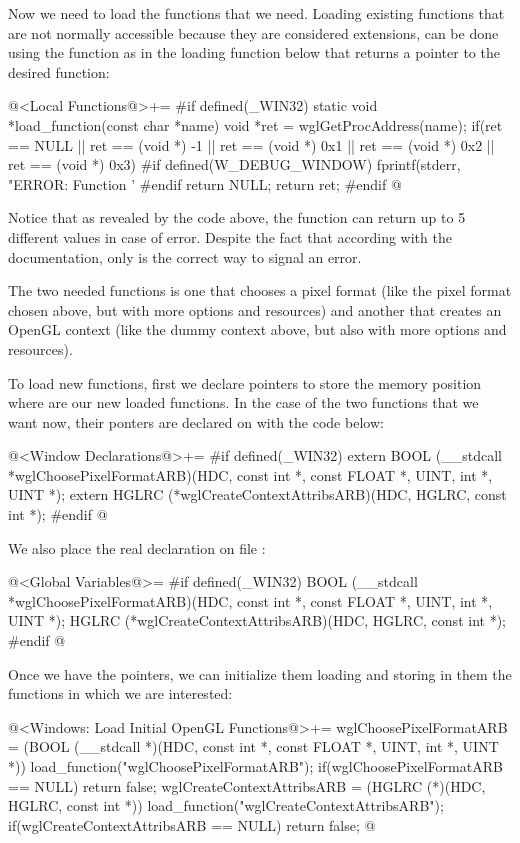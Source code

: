 Now we need to load the functions that we need. Loading existing
functions that are not normally accessible because they are considered
extensions, can be done using the
function  as in the loading function
below that returns a pointer to the desired function:

\iniciocodigo
@<Local Functions@>+=
#if defined(_WIN32)
static void *load_function(const char *name){
  void *ret = wglGetProcAddress(name);
  if(ret == NULL || ret == (void *) -1 || ret == (void *) 0x1 ||
     ret == (void *) 0x2 || ret == (void *) 0x3){
#if defined(W_DEBUG_WINDOW)
    fprintf(stderr, "ERROR: Function '%
#endif
    return NULL;
  }
  return ret;
}
#endif
@
\fimcodigo

Notice that as revealed by the code above, the
function  can return up to 5 different
values in case of error. Despite the fact that according with the
documentation, only  is the correct way to signal an
error.

The two needed functions is one that chooses a pixel format (like the
pixel format chosen above, but with more options and resources) and
another that creates an OpenGL context (like the dummy context above,
but also with more options and resources).

To load new functions, first we declare pointers to store the memory
position where are our new loaded functions. In the case of the two
functions that we want now, their ponters are declared
on  with the code below:

\iniciocodigo
@<Window Declarations@>+=
#if defined(_WIN32)
extern BOOL (__stdcall *wglChoosePixelFormatARB)(HDC, const int *, const FLOAT *,
                                                 UINT, int *, UINT *);
extern HGLRC (*wglCreateContextAttribsARB)(HDC, HGLRC, const int *);
#endif
@
\fimcodigo


We also place the real declaration on file :

\iniciocodigo
@<Global Variables@>=
#if defined(_WIN32)
BOOL (__stdcall *wglChoosePixelFormatARB)(HDC, const int *, const FLOAT *, UINT,
                                          int *, UINT *);
HGLRC (*wglCreateContextAttribsARB)(HDC, HGLRC, const int *);
#endif
@
\fimcodigo

Once we have the pointers, we can initialize them loading and storing
in them the functions in which we are interested:

\iniciocodigo
@<Windows: Load Initial OpenGL Functions@>+=
wglChoosePixelFormatARB = (BOOL (__stdcall *)(HDC, const int *, const FLOAT *,
                                              UINT, int *, UINT *))
                          load_function("wglChoosePixelFormatARB");
if(wglChoosePixelFormatARB == NULL) return false;
wglCreateContextAttribsARB = (HGLRC (*)(HDC, HGLRC, const int *))
                               load_function("wglCreateContextAttribsARB");
if(wglCreateContextAttribsARB == NULL) return false;
@
\fimcodigo

